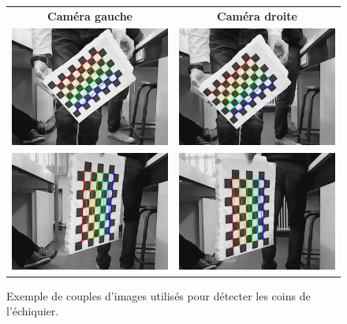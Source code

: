 \begin{figure}
    \begin{center}
        \begin{tabular}{cc}
            \textbf{Caméra gauche} & \textbf{Caméra droite} \\
            \includegraphics[width=0.4\linewidth]{rcs/chess0l.png} & \includegraphics[width=0.4\linewidth]{rcs/chess0r.png} \\
            \includegraphics[width=0.4\linewidth]{rcs/chess1l.png} & \includegraphics[width=0.4\linewidth]{rcs/chess1r.png} \\
        \end{tabular}
    \end{center}
    \caption{Exemple de couples d'images utilisés pour détecter les coins de l'échiquier.}
    \label{chess}
\end{figure}

